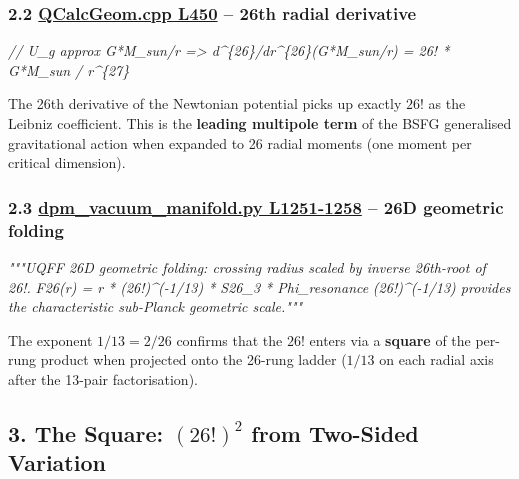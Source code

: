 \documentclass[
]{article}
\newenvironment{Shaded}{}{}
\newcommand{\CommentTok}[1]{\textcolor[rgb]{0.38,0.63,0.69}{\textit{#1}}}
\begin{document}
\subsubsection{\texorpdfstring{2.2
\href{QCalcGeom.cpp\#L450}{QCalcGeom.cpp L450} -- 26th radial
derivative}{2.2 QCalcGeom.cpp L450 -- 26th radial derivative}}\label{qcalcgeom.cpp-l450-26th-radial-derivative}

\begin{Shaded}
\begin{Highlighting}[]
\CommentTok{// U\_g approx G*M\_sun/r  =\textgreater{}  d\^{}\{26\}/dr\^{}\{26\}(G*M\_sun/r) = 26! * G*M\_sun / r\^{}\{27\}}
\end{Highlighting}
\end{Shaded}

The 26th derivative of the Newtonian potential picks up exactly \(26!\)
as the Leibniz coefficient. This is the \textbf{leading multipole term}
of the BSFG generalised gravitational action when expanded to 26 radial
moments (one moment per critical dimension).

\subsubsection{\texorpdfstring{2.3
\href{dpm_vacuum_manifold.py\#L1251}{dpm\_vacuum\_manifold.py
L1251-1258} -- 26D geometric
folding}{2.3 dpm\_vacuum\_manifold.py L1251-1258 -- 26D geometric folding}}\label{dpm_vacuum_manifold.py-l1251-1258-26d-geometric-folding}

\begin{Shaded}
\begin{Highlighting}[]
\CommentTok{"""UQFF 26D geometric folding: crossing radius scaled by inverse 26th{-}root of 26!.}
\CommentTok{F26(r) = r * (26!)\^{}({-}1/13) * S26\_3 * Phi\_resonance}
\CommentTok{(26!)\^{}({-}1/13) provides the characteristic sub{-}Planck geometric scale."""}
\end{Highlighting}
\end{Shaded}

The exponent \(1/13 = 2/26\) confirms that the \(26!\) enters via a
\textbf{square} of the per-rung product when projected onto the 26-rung
ladder (\(1/13\) on each radial axis after the 13-pair factorisation).

\subsection{\texorpdfstring{3. The Square: \((26!)^2\) from Two-Sided
Variation}{3. The Square: (26!)\^{}2 from Two-Sided Variation}}\label{the-square-262-from-two-sided-variation}
\end{document}
